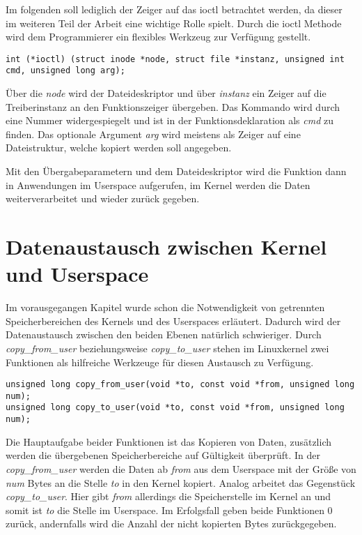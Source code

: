 Im folgenden soll lediglich der Zeiger auf das \acf{ioctl} betrachtet werden, da dieser im weiteren Teil der Arbeit eine wichtige Rolle spielt.
Durch die \ac{ioctl} Methode wird dem Programmierer ein flexibles Werkzeug zur Verfügung gestellt. 

\begin{lstlisting}
int (*ioctl) (struct inode *node, struct file *instanz, unsigned int cmd, unsigned long arg);
\end{lstlisting}

Über die \textit{node} wird der Dateideskriptor und über \textit{instanz} ein Zeiger auf die Treiberinstanz an den Funktionszeiger übergeben. Das Kommando wird durch eine Nummer widergespiegelt und ist in der Funktionsdeklaration als \textit{cmd} zu finden. Das optionale Argument \textit{arg} wird meistens als Zeiger auf eine Dateistruktur, welche kopiert werden soll angegeben. \citep[S. 90f]{corbet2005linux}

Mit den Übergabeparametern und dem Dateideskriptor wird die Funktion dann in Anwendungen im Userspace aufgerufen, im Kernel werden die Daten weiterverarbeitet und wieder zurück gegeben.

\section{Datenaustausch zwischen Kernel und Userspace}
Im vorausgegangen Kapitel wurde schon die Notwendigkeit von getrennten Speicherbereichen des Kernels und des Userspaces erläutert. 
Dadurch wird der Datenaustausch zwischen den beiden Ebenen natürlich schwieriger. Durch \textit{copy\_from\_user} beziehungsweise \textit{copy\_to\_user} stehen im Linuxkernel zwei Funktionen als hilfreiche Werkzeuge für diesen Austausch zu Verfügung.

\begin{lstlisting}
unsigned long copy_from_user(void *to, const void *from, unsigned long num);
unsigned long copy_to_user(void *to, const void *from, unsigned long num);
\end{lstlisting}

Die Hauptaufgabe beider Funktionen ist das Kopieren von Daten, zusätzlich werden die übergebenen Speicherbereiche auf Gültigkeit überprüft. 
In der \textit{copy\_from\_user} werden die Daten ab \textit{from} aus dem Userspace mit der Größe von \textit{num} Bytes an die Stelle \textit{to} in den Kernel kopiert.
Analog arbeitet das Gegenstück \textit{copy\_to\_user}. Hier gibt \textit{from} allerdings die Speicherstelle im Kernel an und somit ist \textit{to} die Stelle im Userspace.
Im Erfolgsfall geben beide Funktionen 0 zurück, andernfalls wird die Anzahl der nicht kopierten Bytes zurückgegeben. \citep[S. 250f]{schroder2009embedded}

